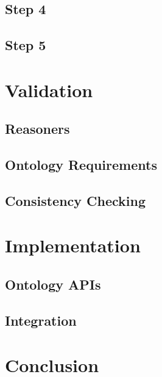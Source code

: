 \documentclass[12pt]{article}
\begin{document}
\subsection{Step 4}


\subsection{Step 5}


\newpage
\section{Validation}


\subsection{Reasoners}


\subsection{Ontology Requirements}


\subsection{Consistency Checking}


\newpage
\section{Implementation}


\subsection{Ontology APIs}


\subsection{Integration}


\newpage

\section{Conclusion}

\newpage

%
%
\end{document}
